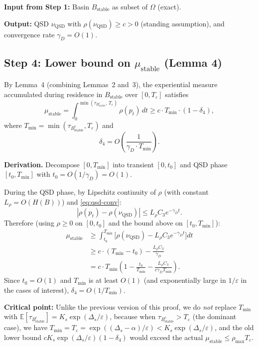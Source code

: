 \documentclass[11pt]{article}
\newcommand{\eps}{\varepsilon}
\newcommand{\Ds}{\Delta_s}
\newcommand{\Bstable}{B_{\mathrm{stable}}}
\newcommand{\Teps}{T_\eps}
\newcommand{\QSD}{\mathrm{QSD}}
\begin{document}
\textbf{Input from Step 1:} Basin $\Bstable$ as subset of $\Omega$
(exact).

\textbf{Output:} QSD $\nu_\QSD$ with $\rho(\nu_\QSD) \geq c > 0$
(standing assumption), and convergence rate $\gamma_D = O(1)$.

\subsection*{Step 4: Lower bound on $\mu_{\mathrm{stable}}$ (Lemma 4)}

By Lemma~4 (combining Lemmas~2 and~3), the experiential measure
accumulated during residence in $\Bstable$ over $[0, \Teps]$ satisfies
\begin{equation}\label{eq:mu-stable}
  \mu_{\mathrm{stable}}
  = \int_0^{\min(\tau_{\Bstable^c},\, \Teps)} \rho(p_t)\, dt
  \geq c \cdot T_{\min} \cdot (1 - \delta_4),
\end{equation}
where $T_{\min} = \min(\tau_{\Bstable^c}, \Teps)$ and
\begin{equation}\label{eq:delta4-proof}
  \delta_4
  = O\!\left(\frac{1}{\gamma_D \cdot T_{\min}}\right).
\end{equation}

\textbf{Derivation.}
Decompose $[0, T_{\min}]$ into transient $[0, t_0]$
and QSD phase $[t_0, T_{\min}]$ with
$t_0 = O(1/\gamma_D) = O(1)$.

During the QSD phase, by Lipschitz continuity of $\rho$ (with constant
$L_\rho = O(H(B))$) and \eqref{eq:qsd-conv}:
\[
  |\rho(p_t) - \rho(\nu_\QSD)|
  \leq L_\rho C_3 e^{-\gamma_D t}.
\]
Therefore (using $\rho \geq 0$ on $[0, t_0]$ and the bound above on
$[t_0, T_{\min}]$):
\begin{align*}
  \mu_{\mathrm{stable}}
  &\geq \int_{t_0}^{T_{\min}}
    \bigl[\rho(\nu_\QSD) - L_\rho C_3 e^{-\gamma_D t}\bigr] dt \\
  &\geq c \cdot (T_{\min} - t_0)
    - \frac{L_\rho C_3}{\gamma_D} \\
  &= c \cdot T_{\min}
    \left(1 - \frac{t_0}{T_{\min}}
    - \frac{L_\rho C_3}{c \gamma_D T_{\min}}\right).
\end{align*}
Since $t_0 = O(1)$ and $T_{\min}$ is at least $O(1)$ (and
exponentially large in $1/\eps$ in the cases of interest),
$\delta_4 = O(1/T_{\min})$.

\textbf{Critical point:} Unlike the previous version of this proof,
we do \emph{not} replace $T_{\min}$ with $\mathbb{E}[\tau_{\Bstable^c}]
= K_s \exp(\Ds/\eps)$, because when $\tau_{\Bstable^c} > \Teps$
(the dominant case), we have $T_{\min} = \Teps = \exp((\Ds-\alpha)/\eps)
< K_s \exp(\Ds/\eps)$, and the old lower bound
$c K_s \exp(\Ds/\eps)(1-\delta_4)$ would exceed the actual
$\mu_{\mathrm{stable}} \leq \rho_{\max} \Teps$.
\end{document}
